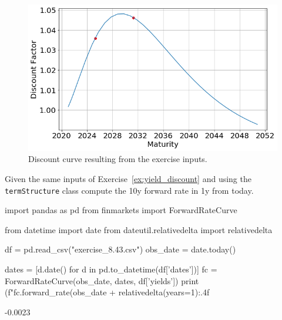 \begin{solution}
\begin{figure}[htpb]
\centering
\includegraphics[width=0.7\linewidth]{figures/ex_discount}
\caption{Discount curve resulting from the exercise inputs.}
\label{fig:ex_discount}
\end{figure}
\end{solution}

%
%


\begin{question}
Given the same inputs of Exercise~\ref{ex:yield_discount} and using the \texttt{termStructure} class compute the 10y forward rate in 1y from today. 
\end{question}

\cprotEnv\begin{solution}
\begin{ipython}
import pandas as pd
from finmarkets import ForwardRateCurve

from datetime import date
from dateutil.relativedelta import relativedelta

df = pd.read_csv("exercise_8.43.csv")
obs_date = date.today()

dates = [d.date() for d in pd.to_datetime(df['dates'])]
fc = ForwardRateCurve(obs_date, dates, df['yields'])
print (f"{fc.forward_rate(obs_date + relativedelta(years=1):.4f}%
\end{ipython}
\begin{ioutput}
-0.0023%
\end{ioutput}
\end{solution}


